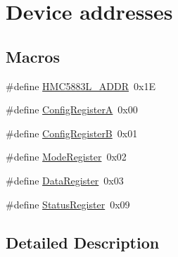 \hypertarget{group___device_addrs}{\section{Device addresses}
\label{group___device_addrs}
}
\subsection*{Macros}
\begin{DoxyCompactItemize}
\item 
\#define \hyperlink{group___device_addrs_gaf476bf33d389e5fc597d87cac399088d}{H\+M\+C5883\+L\+\_\+\+A\+D\+D\+R}~0x1\+E
\item 
\#define \hyperlink{group___device_addrs_ga7c1a102601a1aedb5213d9ec2bdd44d9}{Config\+Register\+A}~0x00
\item 
\#define \hyperlink{group___device_addrs_ga2c4505b7f511c1459a77fb9ef4793cd9}{Config\+Register\+B}~0x01
\item 
\#define \hyperlink{group___device_addrs_ga588e30fd18c31816cde04b8e3b3adf15}{Mode\+Register}~0x02
\item 
\#define \hyperlink{group___device_addrs_gae3e06eef67a36f80ad1fbdbac2049809}{Data\+Register}~0x03
\item 
\#define \hyperlink{group___device_addrs_gacda516aca361386a87975a62eba267d7}{Status\+Register}~0x09
\end{DoxyCompactItemize}


\subsection{Detailed Description}


